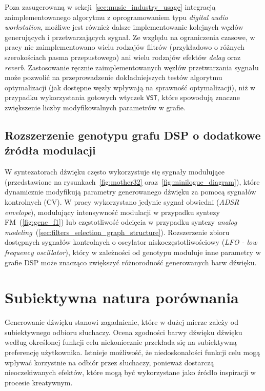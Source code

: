 Poza zasugerowaną w sekcji~\ref{sec:music_industry_usage} integracją
zaimplementowanego algorytmu z oprogramowaniem typu \textit{digital audio workstation},
możliwe jest również dalsze implementowanie kolejnych węzłów generujących
i przetwarzających sygnał. Ze względu na ograniczenia czasowe,
w pracy nie zaimplementowano wielu rodzajów filtrów
(przykładowo o różnych szerokościach pasma przepustowego) ani wielu rodzajów
efektów \textit{delay} oraz \textit{reverb}. Zastosowanie ręcznie zaimplementowanych
węzłów przetwarzania sygnału może pozwolić na przeprowadzenie dokładniejszych
testów algorytmu optymalizacji (jak dostępne węzły wpływają na sprawność optymalizacji),
niż w przypadku wykorzystania gotowych wtyczek
\texttt{VST}, które spowodują znaczne zwiększenie liczby modyfikowalnych parametrów w grafie.

\subsection{Rozszerzenie genotypu grafu DSP o dodatkowe źródła modulacji}

W syntezatorach dźwięku często wykorzystuje się sygnały modulujące (przedstawione
na rysunkach~\ref{fig:mother32} oraz~\ref{fig:minilogue_diagram}), które dynamicznie
modyfikują parametry generowanego dźwięku za pomocą sygnałów kontrolnych (CV). 
W pracy wykorzystano jedynie sygnał obwiedni (\textit{ADSR envelope}),
modulujący intensywność modulacji w przypadku syntezy FM~(\ref{fig:gene_f1})
lub częstotliwość odcięcia w przypadku syntezy
\textit{analog modeling}~(\ref{sec:filters_selection_graph_structure}).
Rozszerzenie zbioru dostępnych sygnałów kontrolnych o oscylator niskoczęstotliwościowy
(\textit{LFO - low frequency oscillator}), który w zależności od genotypu
moduluje inne parametry w grafie DSP może znacząco zwiększyć różnorodność
generowanych barw dźwięku.


\section{Subiektywna natura porównania}

Generowanie dźwięku stanowi zagadnienie,
które w dużej mierze zależy od subiektywnego odbioru słuchaczy.
Ocena zgodności barwy dźwięku dźwięku według określonej funkcji celu
niekoniecznie przekłada się na subiektywną preferencję użytkownika.
Istnieje możliwość, że niedoskonałości funkcji celu mogą wpływać korzystnie na 
odbiór przez słuchaczy, ponieważ dostarczą nieoczekiwanych efektów, 
które mogą być wykorzystane jako źródło inspiracji w procesie kreatywnym.

